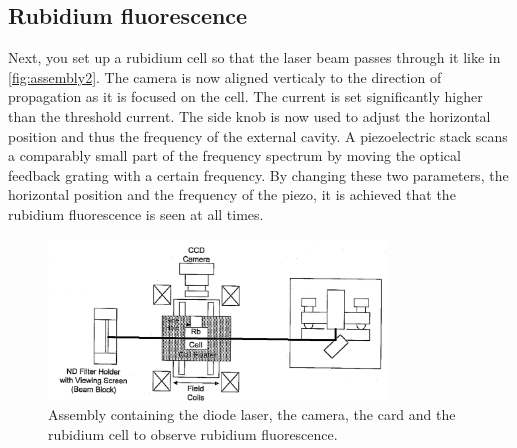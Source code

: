 \FloatBarrier

\subsection{Rubidium fluorescence}
Next, you set up a rubidium cell so that the laser beam passes through it like in \autoref{fig:assembly2}.
The camera is now aligned verticaly to the direction of propagation as it is focused on the cell.
The current is set significantly higher than the threshold current.
The side knob is now used to adjust the horizontal position and thus the frequency of the external cavity.
A piezoelectric stack scans a comparably small part of the frequency spectrum by moving the optical feedback grating with a certain frequency.
By changing these two parameters, the horizontal position and the frequency of the piezo, it is achieved that the rubidium fluorescence is seen at all times.
\begin{figure}
    \center
    \includegraphics[width=0.8\textwidth]{bilder/Assembly_2.png}
    \caption{Assembly containing the diode laser, the camera, the card and the rubidium cell to observe rubidium fluorescence. \cite{anleitung}}
    \label{fig:assembly2}
\end{figure}

\FloatBarrier

